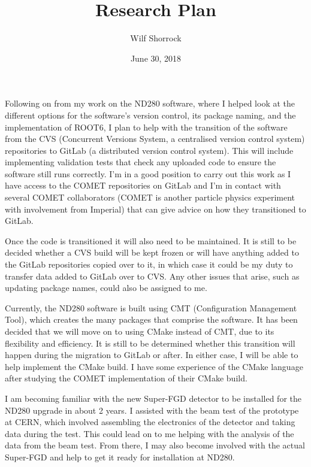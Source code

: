 \documentclass[aps,pra,12pt,notitlepage,tightenlines]{revtex4-1}
\begin{document}
\title{Research Plan\vspace{0mm}}
\author{Wilf Shorrock\vspace{1mm}}
\date{June 30, 2018}

\maketitle

Following on from my work on the ND280 software, where I helped look at the different options for the software's version control, its package naming, and the implementation of ROOT6, I plan to help with the transition of the software from the CVS (Concurrent Versions System, a centralised version control system) repositories to GitLab (a distributed version control system). This will include implementing validation tests that check any uploaded code to ensure the software still runs correctly. I'm in a good position to carry out this work as I have access to the COMET repositories on GitLab and I'm in contact with several COMET collaborators (COMET is another particle physics experiment with involvement from Imperial) that can give advice on how they transitioned to GitLab. 

Once the code is transitioned it will also need to be maintained. It is still to be decided whether a CVS build will be kept frozen or will have anything added to the GitLab repositories copied over to it, in which case it could be my duty to transfer data added to GitLab over to CVS. Any other issues that arise, such as updating package names, could also be assigned to me.

Currently, the ND280 software is built using CMT (Configuration Management Tool), which creates the many packages that comprise the software. It has been decided that we will move on to using CMake instead of CMT, due to its flexibility and efficiency. It is still to be determined whether this transition will happen during the migration to GitLab or after. In either case, I will be able to help implement the CMake build. I have some experience of the CMake language after studying the COMET implementation of their CMake build.

I am becoming familiar with the new Super-FGD detector to be installed for the ND280 upgrade in about 2 years. I assisted with the beam test of the prototype at CERN, which involved assembling the electronics of the detector and taking data during the test. This could lead on to me helping with the analysis of the data from the beam test. From there, I may also become involved with the actual Super-FGD and help to get it ready for installation at ND280.
\end{document}
